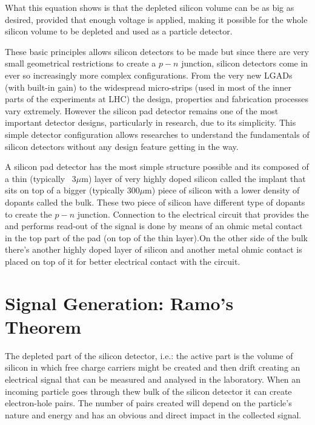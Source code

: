 What this equation shows is that the depleted silicon volume can be as big as desired, provided that enough voltage is applied, making it possible for the whole silicon volume to be depleted and used as a particle detector. 

These basic principles allows silicon detectors to be made but since there are very small geometrical restrictions to create a $p-n$ junction, silicon detectors come in ever so increasingly more complex configurations. From the very new LGADs (with built-in gain) to the widespread micro-strips (used in most of the inner parts of the experiments at LHC) the design, properties and fabrication processes vary extremely. However the silicon pad detector remains one of the most important detector designs, particularly in research, due to its simplicity. This simple detector configuration allows researches to understand the fundamentals of silicon detectors without any design feature getting in the way. 

A silicon pad detector has the most simple structure possible and its composed of a thin (typically ~3$\mu$m) layer of very highly doped silicon called the implant that sits on top of a bigger (typically 300$\mu$m) piece of silicon with a lower density of dopants called the bulk. These two piece of silicon have different type of dopants to create the $p-n$ junction. Connection to the electrical circuit that provides the \vias and performs read-out of the signal is done by means of an ohmic metal contact in the top part of the pad (on top of the thin layer).On the other side of the bulk there's another highly doped layer of silicon and another metal ohmic contact is placed on top of it for better electrical contact with the circuit.

\section{Signal Generation: Ramo's Theorem} %

The depleted part of the silicon detector, i.e.: the active part is the volume of silicon in which free charge carriers might be created and then drift creating an electrical signal that can be measured and analysed in the laboratory. When an incoming particle goes through thew bulk of the silicon detector it can create electron-hole pairs. The number of pairs created will depend on the particle's nature and energy and has an obvious and direct impact in the collected signal. 


